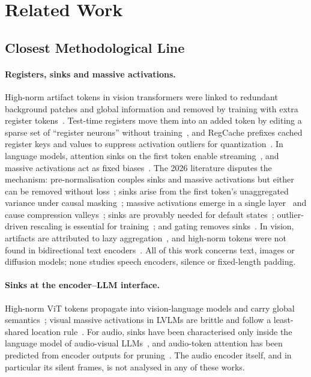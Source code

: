 \section{Related Work}
\label{sec:related}

\subsection{Closest Methodological Line}

\paragraph{Registers, sinks and massive activations.} High-norm artifact tokens in vision transformers were linked to redundant background patches and global information and removed by training with extra register tokens~\cite{darcet2024registers}. Test-time registers move them into an added token by editing a sparse set of ``register neurons'' without training~\cite{jiang2025testtime}, and RegCache prefixes cached register keys and values to suppress activation outliers for quantization~\cite{kim2026regcache}. In language models, attention sinks on the first token enable streaming~\cite{xiao2024streaming}, and massive activations act as fixed biases~\cite{sun2024massive}. The 2026 literature disputes the mechanism: pre-normalisation couples sinks and massive activations but either can be removed without loss~\cite{sun2026anatomy}; sinks arise from the first token's unaggregated variance under causal masking~\cite{li2026structural}; massive activations emerge in a single layer~\cite{shi2026melayer} and cause compression valleys~\cite{queipo2026valleys}; sinks are provably needed for default states~\cite{ranmilo2026necessary}; outlier-driven rescaling is essential for training~\cite{qiu2026residualsinks}; and gating removes sinks~\cite{qiu2025gated}. In vision, artifacts are attributed to lazy aggregation~\cite{shi2026lastvit}, and high-norm tokens were not found in bidirectional text encoders~\cite{wang2025singular}. All of this work concerns text, images or diffusion models; none studies speech encoders, silence or fixed-length padding.

\paragraph{Sinks at the encoder--LLM interface.} High-norm ViT tokens propagate into vision-language models and carry global semantics~\cite{luo2026sink}; visual massive activations in LVLMs are brittle and follow a least-shared location rule~\cite{ngnawe2026spike}. For audio, sinks have been characterised only inside the language model of audio-visual LLMs~\cite{anand2026avsrsinks,jung2026hubs,yoo2026omni}, and audio-token attention has been predicted from encoder outputs for pruning~\cite{park2026triage}. The audio encoder itself, and in particular its silent frames, is not analysed in any of these works.

